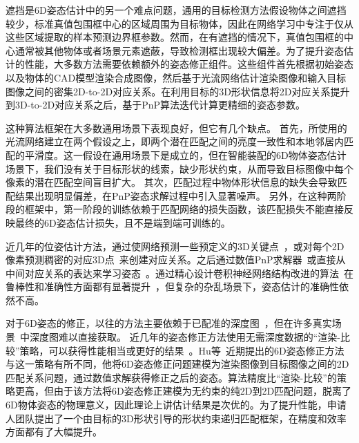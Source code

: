 \documentclass[12pt]{article}
\begin{document}
遮挡是6D姿态估计中的另一个难点问题，通用的目标检测方法假设物体之间遮挡较少，标准真值包围框中心的区域周围为目标物体，因此在网络学习中专注于仅从这些区域提取的样本预测边界框参数。然而，在有遮挡的情况下，真值包围框的中心通常被其他物体或者场景元素遮蔽，导致检测框出现较大偏差。为了提升姿态估计的性能，大多数方法需要依赖额外的姿态修正组件。这些组件首先根据初始姿态以及物体的CAD模型渲染合成图像，然后基于光流网络估计渲染图像和输入目标图像之间的密集2D-to-2D对应关系。在利用目标的3D形状信息将2D对应关系提升到3D-to-2D对应关系之后，基于PnP算法迭代计算更精细的姿态参数。

这种算法框架在大多数通用场景下表现良好，但它有几个缺点。
首先，所使用的光流网络建立在两个假设之上，即两个潜在匹配之间的亮度一致性和本地邻居内匹配的平滑度。这一假设在通用场景下是成立的，但在智能装配的6D物体姿态估计场景下，我们没有关于目标形状的线索，缺少形状约束，从而导致目标图像中每个像素的潜在匹配空间盲目扩大。
其次，匹配过程中物体形状信息的缺失会导致匹配结果出现明显偏差，在PnP姿态求解过程中引入显著噪声。
另外，在这种两阶段的框架中，第一阶段的训练依赖于匹配网络的损失函数，该匹配损失不能直接反映最终的6D姿态估计损失，且不是端到端可训练的。

近几年的位姿估计方法，通过使网络预测一些预定义的3D关键点~\cite{rad2017bb8, hu2019segDriven, peng2019pvnet, Hu2021}，或对每个2D像素预测稠密的对应3D点~\cite{zakharov2019dpod, Su2022, li2019cdpn, wang2021gdrnet, Di2021}来创建对应关系。之后通过数值PnP求解器~\cite{lepetit2009epnp}或直接从中间对应关系的表达来学习姿态~\cite{hu2020singleStage, EroPnP,wang2021gdrnet, Di2021}。通过精心设计卷积神经网络结构改进的算法~\cite{he2016resnet, resnext_2017_cvpr}在鲁棒性和准确性方面都有显著提升~\cite{Xiang2018, peng2019pvnet, wang2019densefusion60}，但复杂的杂乱场景下，姿态估计的准确性依然不高。

对于6D姿态的修正，以往的方法主要依赖于已配准的深度图~\cite{Xiang2018, li2019cdpn, wang2019densefusion60}，但在许多真实场景~\cite{Hu2021}中深度图难以直接获取。
近几年的姿态修正方法使用无需深度数据的“渲染-比较”策略，可以获得性能相当或更好的结果~\cite{li2018deepim, zakharov2019dpod, cosypose, rad2017bb8, Hu2022, Lipson2022, RNNPose_2022_cvpr,Repose_2021_iccv}。Hu等~\cite{Hu2022}近期提出的6D姿态修正方法与这一策略有所不同，他将6D姿态修正问题建模为渲染图像到目标图像之间的2D匹配关系问题，通过数值求解获得修正之后的姿态。算法精度比“渲染-比较”的策略更高，但由于该方法将6D姿态修正建模为无约束的纯2D到2D匹配问题，脱离了6D物体姿态的物理意义，因此理论上讲估计结果是次优的。为了提升性能，申请人团队提出了一个由目标的3D形状引导的形状约束递归匹配框架，在精度和效率方面都有了大幅提升\cite{?}。
\end{document}
